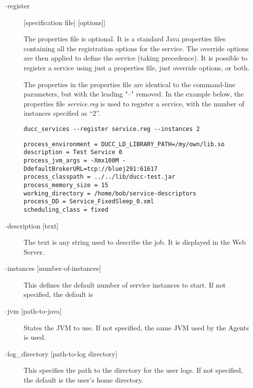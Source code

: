        \begin{description}
           \item[--register] {[specification file] [options]}]

             The properties file is optional. It is a standard Java properties files containing all the 
             registration options for the service. The override options are then applied to define the 
             service (taking precedence). It is possible to register a service using just a properties file, 
             just override options, or both. 
             
             The properties in the properties file are identical to the command-line parameters, but with 
             the leading "--" removed. In the example below, the properties file {\em service.reg} is used
             to register a service, with the number of instances specified as ``2''.
\begin{verbatim}
ducc_services --register service.reg --instances 2
\end{verbatim} 

\begin{verbatim}
process_environment = DUCC_LD_LIBRARY_PATH=/my/own/lib.so 
description = Test Service 0 
process_jvm_args = -Xmx100M -DdefaultBrokerURL=tcp://bluej291:61617 
process_classpath = ../../lib/ducc-test.jar 
process_memory_size = 15 
working_directory = /home/bob/service-descriptors 
process_DD = Service_FixedSleep_0.xml 
scheduling_class = fixed 
\end{verbatim}
         
           \item[--description {[text]}] The text is any string used to describe the job. It is
             displayed in the Web Server. 

           \item[--instances {[number-of-instances]}] This defines the default number of service
             instances to start. If not specified, the default is
             
           \item[--jvm {[path-to-java]}] States the JVM to use. If not specified, the same JVM used by
             the Agents is used. 

           \item[--log\_directory {[path-to-log directory]}] This specifies the path to the directory
             for the user logs. If not specified, the default is the user's home directory.


\end{description}
